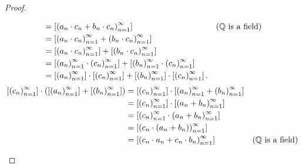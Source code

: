 \begin{proof}
\begin{enumerate}[label={(F\arabic*)},itemsep=0pt,topsep=0pt,start=5]
\begin{align*}
                                                                                                 & = \left[{{\left({a_{n}\cdot c_{n} + b_{n}\cdot c_{n}}\right)}^{\infty}_{n=1}}\right]                                          & \text{($\mathbb{Q}$ is a field)} \\
                                                                                                 & = \left[{{\left({a_{n}\cdot c_{n}}\right)}^{\infty}_{n=1} + {\left({b_{n}\cdot c_{n}}\right)}^{\infty}_{n=1}}\right]                                                                       \\
                                                                                                 & = \left[{{\left({a_{n}\cdot c_{n}}\right)}^{\infty}_{n=1}}\right] + \left[{{\left({b_{n}\cdot c_{n}}\right)}^{\infty}_{n=1}}\right]                                                               \\
                                                                                                 & = \left[{{\left({a_{n}}\right)}^{\infty}_{n=1}\cdot{\left({c_{n}}\right)}^{\infty}_{n=1}}\right] + \left[{{\left({b_{n}}\right)}^{\infty}_{n=1}\cdot{\left({c_{n}}\right)}^{\infty}_{n=1}}\right]                                                     \\
                                                                                                 & = \left[{{\left({a_{n}}\right)}^{\infty}_{n=1}}\right]\cdot\left[{{\left({c_{n}}\right)}^{\infty}_{n=1}}\right] + \left[{{\left({b_{n}}\right)}^{\infty}_{n=1}}\right]\cdot\left[{{\left({c_{n}}\right)}^{\infty}_{n=1}}\right].
              \end{align*}
              \begin{align*}
                  \class{\seq{c_{n}}}\cdot\left(\class{\seq{a_{n}}} + \class{\seq{b_{n}}}\right) & = \class{\seq{c_{n}}}\cdot\class{\seq{a_{n}} + \seq{b_{n}}}                                                                     \\
                                                                                                 & = \class{\seq{c_{n}}}\cdot\class{\seq{a_{n} + b_{n}}}                                                                           \\
                                                                                                 & = \class{\seq{c_{n}}\cdot\seq{a_{n} + b_{n}}}                                                                                   \\
                                                                                                 & = \class{\seq{c_{n}\cdot (a_{n} + b_{n})}}                                                                                      \\
                                                                                                 & = \class{\seq{c_{n}\cdot a_{n} + c_{n}\cdot b_{n}}}                                          & \text{($\mathbb{Q}$ is a field)} \\

\end{align*}
\end{enumerate}
\end{proof}
